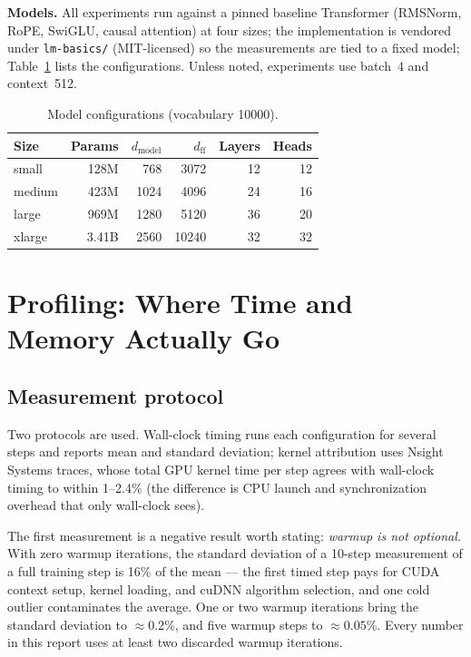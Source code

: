 \documentclass{article}
\begin{document}
\textbf{Models.} All experiments run against a pinned baseline Transformer (RMSNorm, RoPE, SwiGLU, causal attention) at four sizes; the implementation is vendored under \texttt{lm-basics/} (MIT-licensed) so the measurements are tied to a fixed model; Table~\ref{tab:models} lists the configurations. Unless noted, experiments use batch~4 and context~512.

\begin{table}[t]
  \caption{Model configurations (vocabulary 10000).}
  \label{tab:models}
  \centering
  \small
  \begin{tabular}{@{}lrrrrr@{}}
    \toprule
    Size & Params & $d_{\text{model}}$ & $d_{\text{ff}}$ & Layers & Heads \\
    \midrule
    small  & 128M  & 768  & 3072  & 12 & 12 \\
    medium & 423M  & 1024 & 4096  & 24 & 16 \\
    large  & 969M  & 1280 & 5120  & 36 & 20 \\
    xlarge & 3.41B & 2560 & 10240 & 32 & 32 \\
    \bottomrule
  \end{tabular}
\end{table}

\section{Profiling: Where Time and Memory Actually Go}
\label{sec:profiling}

\subsection{Measurement protocol}

Two protocols are used. Wall-clock timing runs each configuration for several steps and reports mean and standard deviation; kernel attribution uses Nsight Systems traces, whose total GPU kernel time per step agrees with wall-clock timing to within 1--2.4\% (the difference is CPU launch and synchronization overhead that only wall-clock sees).

The first measurement is a negative result worth stating: \emph{warmup is not optional.} With zero warmup iterations, the standard deviation of a 10-step measurement of a full training step is 16\% of the mean --- the first timed step pays for CUDA context setup, kernel loading, and cuDNN algorithm selection, and one cold outlier contaminates the average. One or two warmup iterations bring the standard deviation to ${\approx}0.2$\%, and five warmup steps to ${\approx}0.05$\%. Every number in this report uses at least two discarded warmup iterations.
\end{document}
